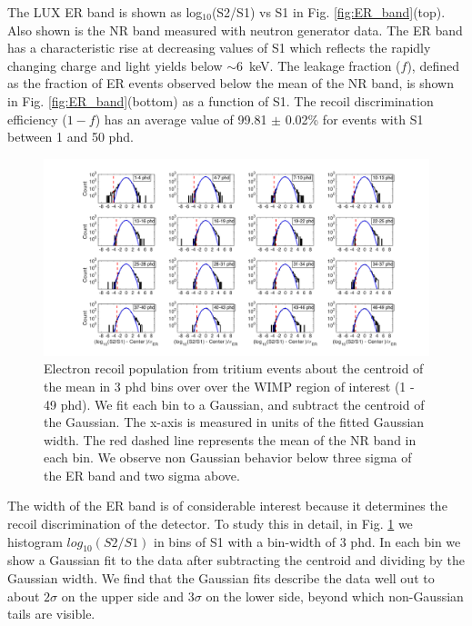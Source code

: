 The LUX ER band is shown as log$_{10}$(S2/S1) vs S1 in Fig. \ref{fig:ER_band}(top).  Also shown is the NR band measured with neutron generator data\cite{DD-paper, lux-reanalysis}. The ER band has a characteristic rise at decreasing values of S1 which reflects the rapidly changing charge and light yields below $\sim$6~keV. The leakage fraction ($f$), defined as the fraction of ER events observed below the mean of the NR band, is shown in Fig. \ref{fig:ER_band}(bottom) as a function of S1. The recoil discrimination efficiency ($1-f$) has an average value of 99.81 $\pm$ 0.02\% for events with S1 between 1 and 50 phd.


\onecolumngrid
\break
\begin{figure}
\includegraphics[width=220mm]{fig/Gaussianity/GaussER_all.png}
\caption{Electron recoil population from tritium events about the centroid of the mean in 3 phd bins over over the WIMP region of interest (1 - 49 phd). We fit each bin to a Gaussian, and subtract the centroid of the Gaussian. The x-axis is measured in units of the fitted Gaussian width. The red dashed line represents the mean of the NR band in each bin. We observe non Gaussian behavior below three sigma of the ER band and two sigma above.  }
\label{fig:ER-Gauss}
\end{figure}
\twocolumngrid


The width of the ER band is of considerable interest because it determines the recoil discrimination of the detector. To study this in detail, in Fig. \ref{fig:ER-Gauss} we histogram $ log_{10}(S2/S1)$ in bins of S1 with a bin-width of 3 phd. In each bin we show a Gaussian fit to the data after subtracting the centroid and dividing by the Gaussian width. We find that the Gaussian fits describe the data well out to about $2\sigma$ on the upper side and $3\sigma$ on the lower side, beyond which non-Gaussian tails are visible.  

